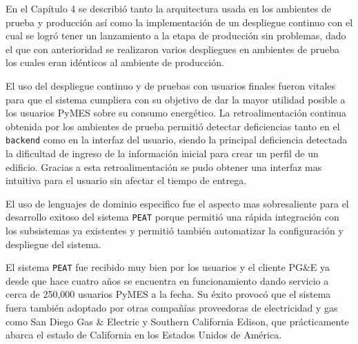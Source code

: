 En el Capítulo 4 se describió tanto la arquitectura usada en los ambientes de
prueba y producción así como la implementación de un despliegue continuo con el
cual se logró tener un lanzamiento a la etapa de producción sin problemas, dado el
que con anterioridad se realizaron varios despliegues en ambientes de prueba
los cuales eran idénticos al ambiente de producción.

El uso del despliegue continuo y de pruebas con usuarios finales fueron vitales para
que el sistema cumpliera con su objetivo de dar la mayor utilidad posible
a los usuarios PyMES sobre su consumo energético. La retroalimentación continua
obtenida por los ambientes de prueba permitió detectar deficiencias tanto en el
\texttt{backend} como en la interfaz del usuario, siendo la principal deficiencia
detectada la dificultad de ingreso de la información inicial para crear un perfil
de un edificio. Gracias a esta retroalimentación se pudo obtener una interfaz
mas intuitiva para el usuario sin afectar el tiempo de entrega.

El uso de lenguajes de dominio especifico fue el aspecto mas sobresaliente
para el desarrollo exitoso del sistema \texttt{PEAT} porque permitió una rápida
integración con los subsistemas ya existentes y permitió también automatizar la
configuración y despliegue del sistema.

El sistema \texttt{PEAT} fue recibido muy bien por los usuarios y el cliente PG\&E
ya desde que hace cuatro años se encuentra en funcionamiento dando servicio a cerca
de 250,000 usuarios PyMES a la fecha\cite{30_pge_annual_report}. Su éxito provocó que
el sistema fuera también adoptado por otras compañías proveedoras de electricidad y
gas como San Diego Gas \& Electric\cite{32_reuters_c3} y Southern California Edison,
que prácticamente abarca el estado de California en los Estados Unidos de
América\cite{31_energy_map}.
